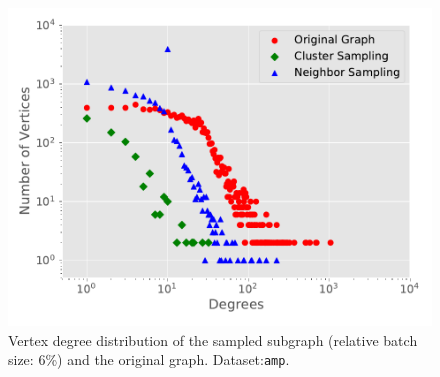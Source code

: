 \begin{figure}[h]
    \centering
    \includegraphics[width=0.4\columnwidth]{figs/experiments/exp_sampling_minibatch_degrees_distribution_amazon-photo.pdf}
    \caption{Vertex degree distribution of the sampled subgraph (relative batch size: 6\%) and the original graph. Dataset:\texttt{amp}.}
    \label{fig:exp_sampling_minibatch_degrees_distribution}
\end{figure}

